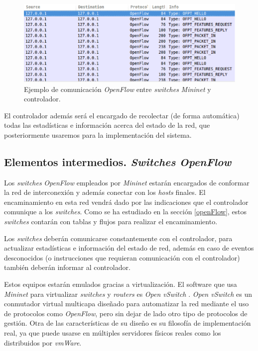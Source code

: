 \documentclass[a4paper,11pt]{book}
\begin{document}
\begin{figure}[tb]
\centering
\includegraphics[scale=0.5]{./figuras/openflow1}
\caption{Ejemplo de comunicación \emph{OpenFlow} entre \textit{switches} \emph{Mininet} y controlador.}\label{openflow1}
\end{figure}

El controlador además será el encargado de recolectar (de forma automática) todas las estadísticas e información acerca del estado de la red, que posteriormente usaremos para la implementación del sistema.

\subsection{Elementos intermedios. \textit{Switches} \emph{OpenFlow}}
Los \textit{switches} \emph{OpenFlow} empleados por \emph{Mininet} estarán encargados de conformar la red de interconexión y además conectar con los \textit{hosts} finales. El encaminamiento en esta red vendrá dado por las indicaciones que el controlador comunique a los \textit{switches}. Como se ha estudiado en la sección \ref{openFlow}, estos \textit{switches} contarán con tablas y flujos para realizar el encaminamiento. 

Los \textit{switches} deberán comunicarse constantemente con el controlador, para actualizar estadísticas e información del estado de red, además en caso de eventos desconocidos (o instrucciones que requieran comunicación con el controlador) también deberán informar al controlador. 

Estos equipos estarán emulados gracias a virtualización. El software que usa \emph{Mininet} para virtualizar \textit{switches} y \textit{routers} es \textit{Open vSwitch} \cite{openvswitch}. \textit{Open vSwitch} es un conmutador virtual multicapa diseñado para automatizar la red mediante el uso de protocolos como \emph{OpenFlow}, pero sin dejar de lado otro tipo de protocolos de gestión. Otra de las características de su diseño es su filosofía de implementación real, ya que puede usarse en múltiples servidores físicos reales como los distribuidos por \textit{vmWare}. 
\end{document}
